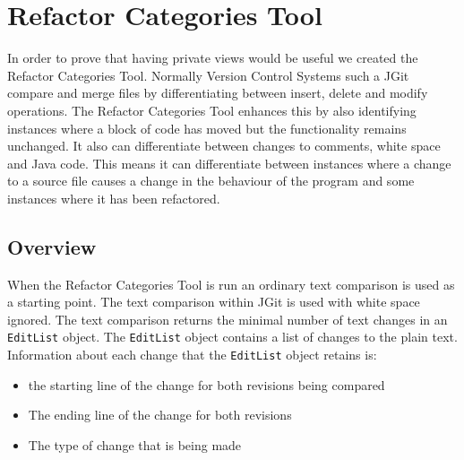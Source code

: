 
\chapter{Refactor Categories Tool}
In order to prove that having private views would be useful we created the Refactor Categories Tool. Normally Version Control Systems such a JGit compare and merge files by differentiating between insert, delete and modify operations. The Refactor Categories Tool enhances this by also identifying instances where a block of code has moved but the functionality remains unchanged. It also can differentiate between changes to comments, white space and Java code. This means it can differentiate between instances where a change to a source file causes a change in the behaviour of the program and some instances where it has been refactored.  



\section{Overview}
When the Refactor Categories Tool is run an ordinary text comparison is used as a starting point.  The text comparison within JGit is used with white space ignored. \label{matchingTextWithAST} The text comparison returns the minimal number of text changes in an \lstinline{EditList} object. The \lstinline{EditList} object contains a list of changes to the plain text. Information about each change that the \lstinline{EditList} object retains is:

\begin{itemize}
  \item the starting line of the change for both revisions being compared
  \item The ending line of the change for both revisions 
  \item The type of change that is being made
\end{itemize}

